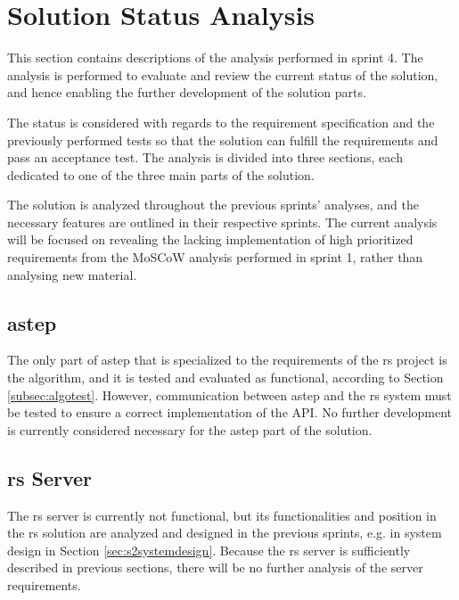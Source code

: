 \section{Solution Status Analysis}
This section contains descriptions of the analysis performed in sprint 4.
The analysis is performed to evaluate and review the current status of the solution, and hence enabling the further development of the solution parts.

The status is considered with regards to the requirement specification and the previously performed tests so that the solution can fulfill the requirements and pass an acceptance test.
The analysis is divided into three sections, each dedicated to one of the three main parts of the solution.

The solution is analyzed throughout the previous sprints' analyses, and the necessary features are outlined in their respective sprints.
The current analysis will be focused on revealing the lacking implementation of high prioritized requirements from the MoSCoW analysis performed in sprint 1, rather than analysing new material.


\subsection{\gls{astep}}

The only part of \gls{astep} that is specialized to the requirements of the \gls{rs} project is the algorithm, and it is tested and evaluated as functional, according to Section \ref{subsec:algotest}. 
However, communication between \gls{astep} and the \gls{rs} system must be tested to ensure a correct implementation of the API.
No further development is currently considered necessary for the \gls{astep} part of the solution.


\subsection{\gls{rs} Server}
The \gls{rs} server is currently not functional, but its functionalities and position in the \gls{rs} solution are analyzed and designed in the previous sprints, e.g. in system design in Section \ref{sec:s2systemdesign}. Because the \gls{rs} server is sufficiently described in previous sections, there will be no further analysis of the server requirements.

